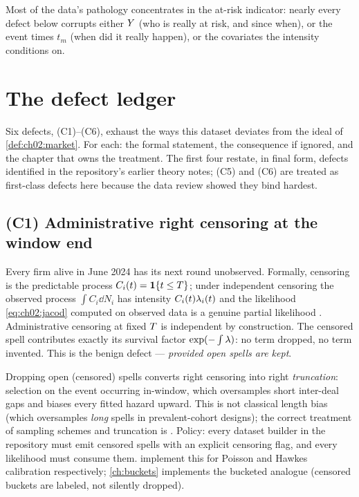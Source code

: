 Most of the data's pathology concentrates in the at-risk indicator:
nearly every defect below corrupts either $Y$ (who is really at
risk, and since when), or the event times $t_m$ (when did it really
happen), or the covariates the intensity conditions on.

\section{The defect ledger}\label{ch02:sec:defects}

Six defects, (C1)--(C6), exhaust the ways this dataset deviates from the
ideal of \cref{def:ch02:market}. For each: the formal statement, the
consequence if ignored, and the chapter that owns the treatment. The first
four restate, in final form, defects identified in the repository's
earlier theory notes; (C5) and (C6) are treated as first-class defects
here because the data review showed they bind hardest.

\subsection*{(C1) Administrative right censoring at the window end}

Every firm alive in June 2024 has its next round unobserved. Formally,
censoring is the predictable process $C_i(t) = \mathbf{1}\{t \le T\}$;
under independent censoring the observed process $\int C_i \dd N_i$ has
intensity $C_i(t)\lambda_i(t)$ and the likelihood \cref{eq:ch02:jacod}
computed on observed data is a genuine partial likelihood
\citep[III.2]{abgk1993}. Administrative censoring at fixed $T$ is
independent by construction. The censored spell contributes exactly its
survival factor $\exp(-\int \lambda)$: no term dropped, no term invented.
This is the benign defect --- \emph{provided open spells are kept}.

\begin{warning}\label{warn:ch02:openspells}
Dropping open (censored) spells converts right censoring into right
\emph{truncation}: selection on the event occurring in-window, which
oversamples short inter-deal gaps and biases every fitted hazard upward.
This is not classical length bias (which oversamples \emph{long} spells in
prevalent-cohort designs); the correct treatment of sampling schemes and
truncation is \citet{kalbfleisch2002}. Policy: every dataset builder in
the repository must emit censored spells with an explicit censoring flag,
and every likelihood must consume them. 
implement this for Poisson and Hawkes calibration respectively;
\cref{ch:buckets} implements the bucketed analogue (censored buckets are
labeled, not silently dropped).
\end{warning}

